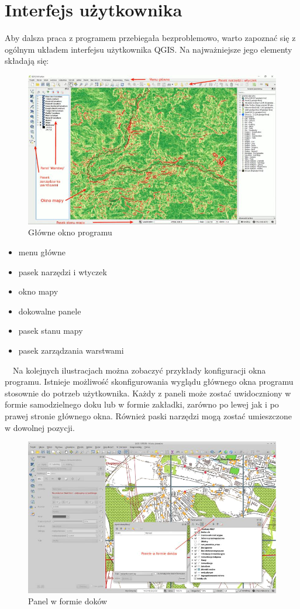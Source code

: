 \documentclass[12pt,a4paper]{book}
\begin{document}
\section{Interfejs użytkownika}
Aby dalsza praca z programem przebiegała bezproblemowo, warto zapoznać się z ogólnym układem interfejsu użytkownika QGIS. Na najważniejsze jego elementy składają się:
\begin{figure}[t]
	\centering
	\includegraphics[scale=0.45]{001-interfejs.jpg}
	\caption{Główne okno programu}
\end{figure}
\begin{itemize}
\item menu główne
\item pasek narzędzi i wtyczek
\item okno mapy
\item dokowalne panele
\item pasek stanu mapy
\item pasek zarządzania warstwami
\end{itemize}
\ \ Na kolejnych ilustracjach można zobaczyć przykłady konfiguracji okna programu. Istnieje możliwość skonfigurowania wyglądu głównego okna programu stosownie do potrzeb użytkownika. Każdy z paneli może zostać uwidoczniony w formie samodzielnego doku lub w formie zakładki, zarówno po lewej jak i po prawej stronie głównego okna. Również paski narzędzi mogą zostać umieszczone w dowolnej pozycji. 
\begin{figure}[ht]
	\centering
	\includegraphics[scale=0.45]{001-panele.png}
	\caption{Panel w formie doków}
\end{figure}
\end{document}
